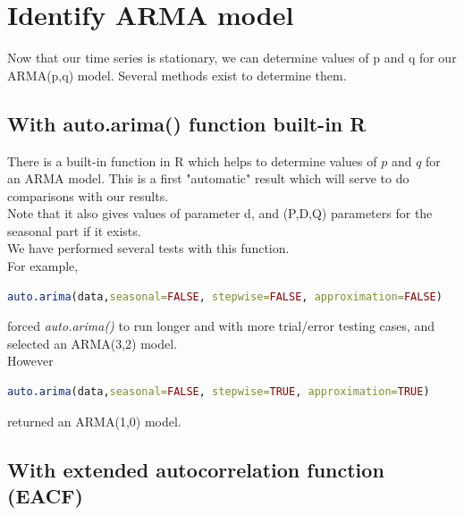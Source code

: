 \label{sec:03IdentifyARMAmodel}
\section{Identify ARMA model}
Now that our time series is stationary, we can determine values of p and q for our ARMA(p,q) model. Several methods exist to determine them. \\

\subsection{With auto.arima() function built-in R}
There is a built-in function in R which helps to determine values of $p$ and $q$ for an ARMA model. This is a first "automatic" result which will serve to do comparisons with our results. \\
Note that it also gives values of parameter d, and (P,D,Q) parameters for the seasonal part if it exists. \\
We have performed several tests with this function. \\
For example, 
\begin{lstlisting}[language=R]
auto.arima(data,seasonal=FALSE, stepwise=FALSE, approximation=FALSE)
\end{lstlisting}
forced \textit{auto.arima()} to run longer and with more trial/error testing cases, and selected an ARMA(3,2) model. \\
However 
\begin{lstlisting}[language=R]
auto.arima(data,seasonal=FALSE, stepwise=TRUE, approximation=TRUE)
\end{lstlisting} 
returned an ARMA(1,0) model.


\subsection{With extended autocorrelation function (EACF)}


